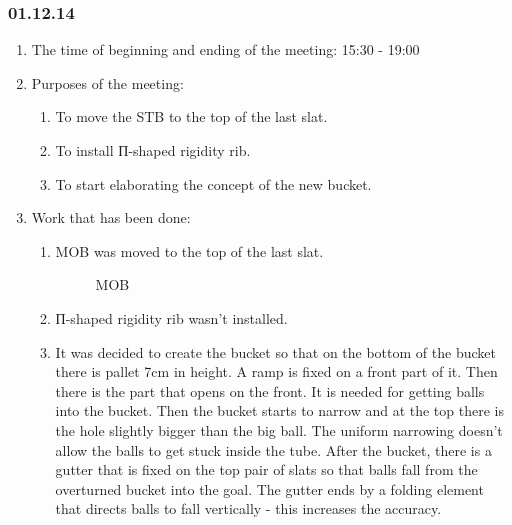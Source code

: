 \subsubsection{01.12.14}

\begin{enumerate}
	\item The time of beginning and ending of the meeting:
	15:30 - 19:00
	\item Purposes of the meeting:
	\begin{enumerate}
		\item To move the STB to the top of the last slat.
		
		\item To install П-shaped rigidity rib.
		
		\item To start elaborating the concept of the new bucket.
		
	\end{enumerate}
	\item Work that has been done:
	\begin{enumerate}
		\item MOB was moved to the top of the last slat.
		
		\begin{figure}[H]
			\begin{minipage}[h]{0.2\linewidth}
				\center  
			\end{minipage}
			\begin{minipage}[h]{0.6\linewidth}
				\caption{MOB}
			\end{minipage}
		\end{figure}
		
		\item П-shaped rigidity rib wasn't installed.
		
		\item It was decided to create the bucket so that on the bottom of the bucket there is pallet 7cm in height. A ramp is fixed on a front part of it. Then there is the part that opens on the front. It is needed for getting balls into the bucket. Then the bucket starts to narrow and at the top there is the hole slightly bigger than the big ball. The uniform narrowing doesn't allow the balls to get stuck inside the tube. After the bucket, there is a gutter that is fixed on the top pair of slats so that balls fall from the overturned bucket into the goal. The gutter ends by a folding element that directs balls to fall vertically - this increases the accuracy.
		

\end{enumerate}
\end{enumerate}
